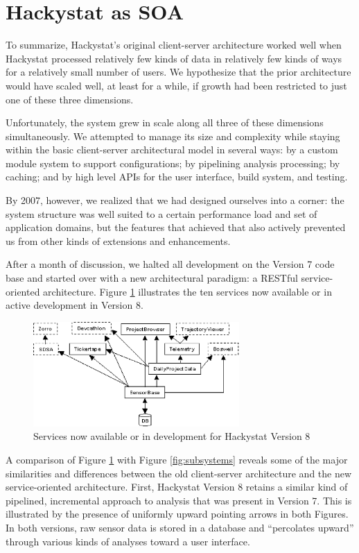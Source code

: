 \documentclass[conference,compsoc]{IEEEtran}
\begin{document}
\section{Hackystat as SOA}
\label{sec:soa}

To summarize, Hackystat's original client-server architecture worked well
when Hackystat processed relatively few kinds of data in relatively few
kinds of ways for a relatively small number of users.  We hypothesize that
the prior architecture would have scaled well, at least for a while, if
growth had been restricted to just one of these three dimensions.

Unfortunately, the system grew in scale along all three of these dimensions
simultaneously.  We attempted to manage its size and complexity while
staying within the basic client-server architectural model in several ways:
by a custom module system to support configurations; by pipelining analysis
processing; by caching; and by high level APIs for the user interface,
build system, and testing.

By 2007, however, we realized that we had designed ourselves into a
corner: the system structure was well suited to a certain performance
load and set of application domains, but the features that achieved that
also actively prevented us from other kinds of extensions and enhancements.

After a month of discussion, we halted all development on the Version 7
code base and started over with a new architectural paradigm: a RESTful
service-oriented architecture.  Figure \ref{fig:soa} illustrates the
ten services now available or in active development in Version 8.

\begin{figure}[ht]
  \center
  \includegraphics[width=0.7\textwidth]{soa.eps}
  \caption{Services now available or in development for Hackystat Version 8}
  \label{fig:soa}
\end{figure} 

A comparison of Figure \ref{fig:soa} with Figure \ref{fig:subsystems}
reveals some of the major similarities and differences between the old
client-server architecture and the new service-oriented architecture.
First, Hackystat Version 8 retains a similar kind of pipelined, incremental
approach to analysis that was present in Version 7. This is illustrated by
the presence of uniformly upward pointing arrows in both Figures.  In both
versions, raw sensor data is stored in a database and ``percolates upward''
through various kinds of analyses toward a user interface.
\end{document}
